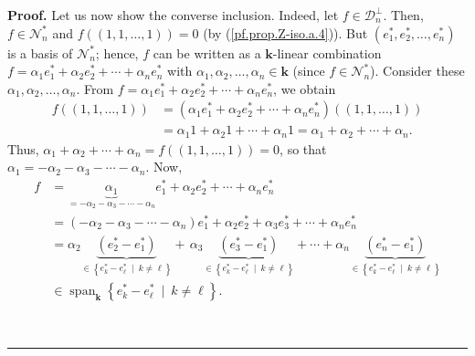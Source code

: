 \documentclass[numbers=enddot,12pt,final,onecolumn,notitlepage]{scrartcl}%
\theoremstyle{definition}
\newenvironment{proof}[1][Proof]{\noindent\textbf{#1.} }{\ \rule{0.5em}{0.5em}}
\begin{document}
\begin{proof}
Let us now show the converse inclusion. Indeed, let $f\in\mathcal{D}%
_{n}^{\perp}$. Then, $f\in\mathcal{N}_{n}^{\ast}$ and $f\left(  \left(
1,1,\ldots,1\right)  \right)  =0$ (by (\ref{pf.prop.Z-iso.a.4})). But $\left(
e_{1}^{\ast},e_{2}^{\ast},\ldots,e_{n}^{\ast}\right)  $ is a basis of
$\mathcal{N}_{n}^{\ast}$; hence, $f$ can be written as a $\mathbf{k}$-linear
combination $f=\alpha_{1}e_{1}^{\ast}+\alpha_{2}e_{2}^{\ast}+\cdots+\alpha
_{n}e_{n}^{\ast}$ with $\alpha_{1},\alpha_{2},\ldots,\alpha_{n}\in\mathbf{k}$
(since $f\in\mathcal{N}_{n}^{\ast}$). Consider these $\alpha_{1},\alpha
_{2},\ldots,\alpha_{n}$. From $f=\alpha_{1}e_{1}^{\ast}+\alpha_{2}e_{2}^{\ast
}+\cdots+\alpha_{n}e_{n}^{\ast}$, we obtain
\begin{align*}
f\left(  \left(  1,1,\ldots,1\right)  \right)   &  =\left(  \alpha_{1}%
e_{1}^{\ast}+\alpha_{2}e_{2}^{\ast}+\cdots+\alpha_{n}e_{n}^{\ast}\right)
\left(  \left(  1,1,\ldots,1\right)  \right) \\
&  =\alpha_{1}1+\alpha_{2}1+\cdots+\alpha_{n}1=\alpha_{1}+\alpha_{2}%
+\cdots+\alpha_{n}.
\end{align*}
Thus, $\alpha_{1}+\alpha_{2}+\cdots+\alpha_{n}=f\left(  \left(  1,1,\ldots
,1\right)  \right)  =0$, so that $\alpha_{1}=-\alpha_{2}-\alpha_{3}%
-\cdots-\alpha_{n}$. Now,%
\begin{align*}
f  &  =\underbrace{\alpha_{1}}_{=-\alpha_{2}-\alpha_{3}-\cdots-\alpha_{n}%
}e_{1}^{\ast}+\alpha_{2}e_{2}^{\ast}+\cdots+\alpha_{n}e_{n}^{\ast}\\
&  =\left(  -\alpha_{2}-\alpha_{3}-\cdots-\alpha_{n}\right)  e_{1}^{\ast
}+\alpha_{2}e_{2}^{\ast}+\alpha_{3}e_{3}^{\ast}+\cdots+\alpha_{n}e_{n}^{\ast
}\\
&  =\alpha_{2}\underbrace{\left(  e_{2}^{\ast}-e_{1}^{\ast}\right)  }%
_{\in\left\{  e_{k}^{\ast}-e_{\ell}^{\ast}\ \mid\ k\neq\ell\right\}
}+\,\alpha_{3}\underbrace{\left(  e_{3}^{\ast}-e_{1}^{\ast}\right)  }%
_{\in\left\{  e_{k}^{\ast}-e_{\ell}^{\ast}\ \mid\ k\neq\ell\right\}  }%
+\cdots+\alpha_{n}\underbrace{\left(  e_{n}^{\ast}-e_{1}^{\ast}\right)  }%
_{\in\left\{  e_{k}^{\ast}-e_{\ell}^{\ast}\ \mid\ k\neq\ell\right\}  }\\
&  \in\operatorname*{span}\nolimits_{\mathbf{k}}\left\{  e_{k}^{\ast}-e_{\ell
}^{\ast}\ \mid\ k\neq\ell\right\}  .
\end{align*}



\end{proof}
\end{document}
